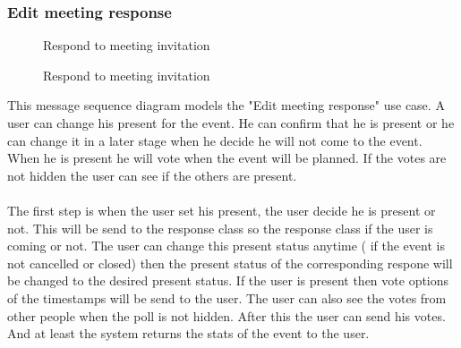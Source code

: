 	\subsubsection{Edit meeting response}
		\begin{figure}[H]
			\centering
			\begin{msc}{Respond to meeting invitation}

				\nextlevel
				\nextlevel

				\nextlevel
				\nextlevel

				\nextlevel
				\nextlevel
				\nextlevel
				\nextlevel
				\nextlevel
				
				\nextlevel
			\end{msc}
			\caption{Respond to meeting invitation}
			\label{msc:respondinvite}
		\end{figure}

		This message sequence diagram models the "Edit meeting response" use case. A user can change his present for the event. He can confirm that he is present or he can change it in a later stage when he decide he will not come to the event. When he is present he will vote when the event will be planned. If the votes are not hidden the user can see if the others are present.\\\\
		The first step is when the user set his present, the user decide he is present or not. This will be send to the response class so the response class if the user is coming or not. The user can change this present status anytime ( if the event is not cancelled or closed) then the present status of the corresponding respone will be changed to the desired present status. If the user is present then vote options of the timestamps will be send to the user. The user can also see the votes from other people when the poll is not hidden. After this the user can send his votes. And at least the system returns the stats of the event to the user.

